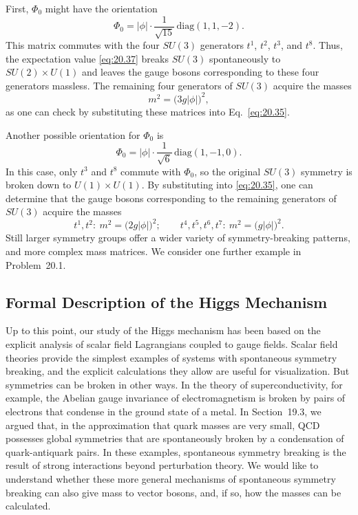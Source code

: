First, $\Phi_0$ might have the orientation
\begin{equation}
  \Phi_0 = |\phi|\cdot\frac{1}{\sqrt{15}}\,
    \mathrm{diag}(1, 1, -2) .
  \label{eq:20.37}
\end{equation}
This matrix commutes with the four $SU(3)$ generators $t^1$, $t^2$, $t^3$, and
$t^8$.  Thus, the expectation value \eqref{eq:20.37} breaks $SU(3)$
spontaneously to $SU(2)\times U(1)$ and leaves the gauge bosons corresponding
to these four generators massless.  The remaining four generators of $SU(3)$
acquire the masses
\begin{equation}
  m^2 = \bigl( 3g|\phi| \bigr)^2 ,
  \label{eq:20.40}
\end{equation}
as one can check by substituting these matrices into Eq.~\eqref{eq:20.35}.

Another possible orientation for $\Phi_0$ is
\begin{equation}
  \Phi_0 = |\phi|\cdot\frac{1}{\sqrt{6}}\,
    \mathrm{diag}(1, -1, 0) .
  \label{eq:20.41}
\end{equation}
In this case, only $t^3$ and $t^8$ commute with $\Phi_0$, so the original
$SU(3)$ symmetry is broken down to $U(1)\times U(1)$.  By substituting into
\eqref{eq:20.35}, one can determine that the gauge bosons corresponding to
the remaining generators of $SU(3)$ acquire the masses
\begin{equation}
  t^1, t^2:\ m^2 = \bigl( 2g|\phi| \bigr)^2;\qquad
  t^4, t^5, t^6, t^7:\ m^2 = \bigl( g|\phi| \bigr)^2 .
  \label{eq:20.42}
\end{equation}
Still larger symmetry groups offer a wider variety of symmetry-breaking
patterns, and more complex mass matrices.  We consider one further example
in Problem~20.1.

\subsection{Formal Description of the Higgs Mechanism}

Up to this point, our study of the Higgs mechanism has been based on the
explicit analysis of scalar field Lagrangians coupled to gauge fields.  Scalar
field theories provide the simplest examples of systems with spontaneous
symmetry breaking, and the explicit calculations they allow are useful for
visualization.  But symmetries can be broken in other ways.  In the theory of
superconductivity, for example, the Abelian gauge invariance of
electromagnetism is broken by pairs of electrons that condense in the ground
state of a metal.  In Section~19.3, we argued that, in the approximation that
quark masses are very small, QCD possesses global symmetries that are
spontaneously broken by a condensation of quark-antiquark pairs.  In these
examples, spontaneous symmetry breaking is the result of strong interactions
beyond perturbation theory.  We would like to understand whether these more
general mechanisms of spontaneous symmetry breaking can also give mass to
vector bosons, and, if so, how the masses can be calculated.

